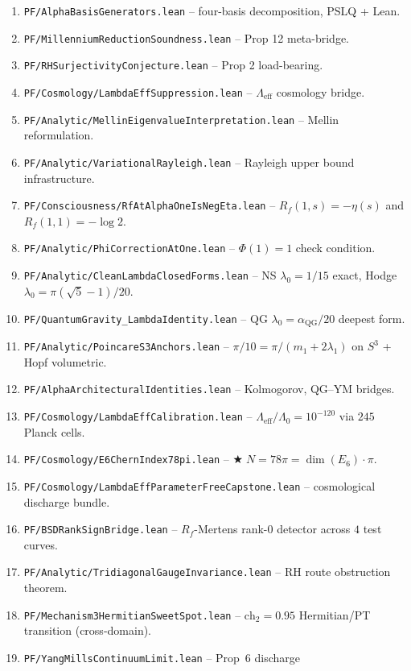 \documentclass[11pt,a4paper]{article}
\theoremstyle{definition}
\begin{document}
\begin{enumerate}\itemsep0pt
\item \texttt{PF/AlphaBasisGenerators.lean} -- four-basis decomposition,
PSLQ + Lean.
\item \texttt{PF/MillenniumReductionSoundness.lean} -- Prop 12
meta-bridge.
\item \texttt{PF/RHSurjectivityConjecture.lean} -- Prop 2 load-bearing.
\item \texttt{PF/Cosmology/LambdaEffSuppression.lean} -- $\Lambda_{\mathrm{eff}}$
cosmology bridge.
\item \texttt{PF/Analytic/MellinEigenvalueInterpretation.lean} -- Mellin
reformulation.
\item \texttt{PF/Analytic/VariationalRayleigh.lean} -- Rayleigh upper
bound infrastructure.
\item \texttt{PF/Consciousness/RfAtAlphaOneIsNegEta.lean} --
$R_f(1,s) = -\eta(s)$ and $R_f(1,1) = -\log 2$.
\item \texttt{PF/Analytic/PhiCorrectionAtOne.lean} -- $\Phi(1) = 1$
check condition.
\item \texttt{PF/Analytic/CleanLambdaClosedForms.lean} -- NS $\lambda_0
= 1/15$ exact, Hodge $\lambda_0 = \pi(\sqrt 5 - 1)/20$.
\item \texttt{PF/QuantumGravity\_LambdaIdentity.lean} -- QG $\lambda_0
= \alpha_{\mathrm{QG}}/20$ deepest form.
\item \texttt{PF/Analytic/PoincareS3Anchors.lean} -- $\pi/10 = \pi/(m_1
+ 2\lambda_1)$ on $S^3$ + Hopf volumetric.
\item \texttt{PF/AlphaArchitecturalIdentities.lean} -- Kolmogorov,
QG--YM bridges.
\item \texttt{PF/Cosmology/LambdaEffCalibration.lean} -- $\Lambda_{\mathrm{eff}}/\Lambda_0
= 10^{-120}$ via $245$ Planck cells.
\item \texttt{PF/Cosmology/E6ChernIndex78pi.lean} -- $\bigstar\;
N = 78\pi = \dim(E_6) \cdot \pi$.
\item \texttt{PF/Cosmology/LambdaEffParameterFreeCapstone.lean} --
cosmological discharge bundle.
\item \texttt{PF/BSDRankSignBridge.lean} -- $R_f$-Mertens rank-$0$
detector across $4$ test curves.
\item \texttt{PF/Analytic/TridiagonalGaugeInvariance.lean} -- RH route
obstruction theorem.
\item \texttt{PF/Mechanism3HermitianSweetSpot.lean} -- $\mathrm{ch}_2
= 0.95$ Hermitian/PT transition (cross-domain).
\item \texttt{PF/YangMillsContinuumLimit.lean} -- Prop~6 discharge

\end{enumerate}
\end{document}
